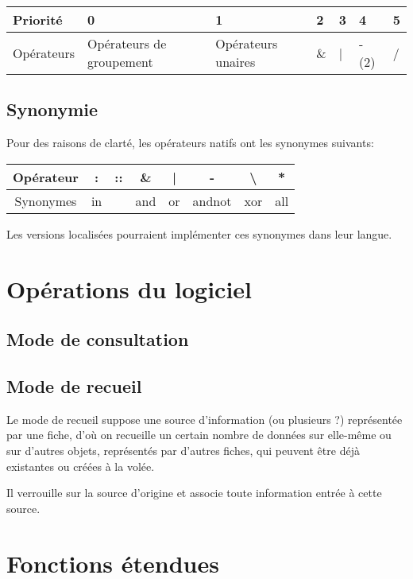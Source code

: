 \documentclass[11pt]{article}
\begin{document}
\begin{tabular}{|l||l|l|l|l|l|l|}
\hline 
Priorité & 0 & 1 & 2 & 3 & 4 & 5\tabularnewline
\hline 
Opérateurs & Opérateurs de groupement & Opérateurs unaires & \& & | & - (2) & /\tabularnewline
\hline 
\end{tabular}

\subsection{Synonymie}\label{synonymie}

Pour des raisons de clarté, les opérateurs natifs ont les synonymes
suivants:

\begin{tabular}{|c||c|c|c|c|c|c|c|}
\hline 
Opérateur & : & :: & \& & | & - & \textbackslash{} & {*}\tabularnewline
\hline 
Synonymes & in &  & and & or & andnot & xor & all\tabularnewline
\hline 
\end{tabular}

Les versions localisées pourraient implémenter ces synonymes dans leur
langue.

\section{Opérations du logiciel}\label{opuxe9rations-du-logiciel}

\subsection{Mode de consultation}\label{mode-de-consultation}

\subsection{Mode de recueil}\label{mode-de-recueil}

Le mode de recueil suppose une source d'information (ou plusieurs ?)
représentée par une fiche, d'où on recueille un certain nombre de
données sur elle-même ou sur d'autres objets, représentés par d'autres
fiches, qui peuvent être déjà existantes ou créées à la volée.

Il verrouille sur la source d'origine et associe toute information
entrée à cette source.

\section{Fonctions étendues}\label{fonctions-uxe9tendues}
\end{document}
